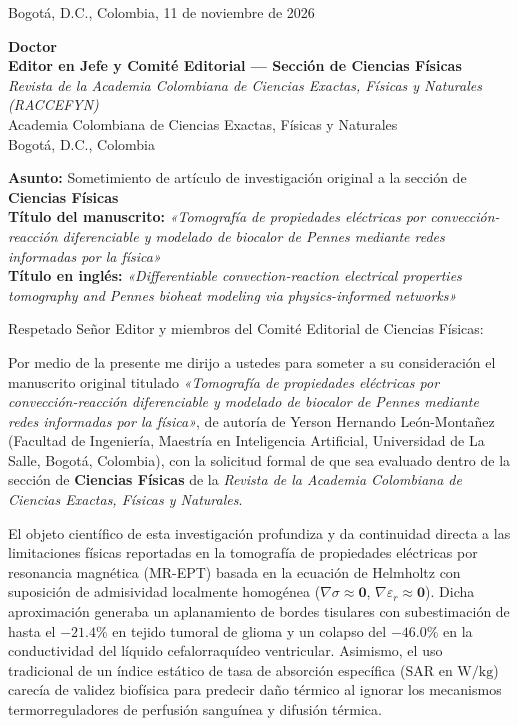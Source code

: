 \documentclass[11pt,a4paper]{article}
\begin{document}
\begin{flushright}
Bogotá, D.C., Colombia, 11 de noviembre de 2026
\end{flushright}

\vspace{0.3cm}

\noindent\textbf{Doctor}\\
\textbf{Editor en Jefe y Comité Editorial — Sección de Ciencias Físicas}\\
\textit{Revista de la Academia Colombiana de Ciencias Exactas, Físicas y Naturales (RACCEFYN)}\\
Academia Colombiana de Ciencias Exactas, Físicas y Naturales\\
Bogotá, D.C., Colombia

\vspace{0.4cm}

\noindent\textbf{Asunto:} Sometimiento de artículo de investigación original a la sección de \textbf{Ciencias Físicas}\\
\textbf{Título del manuscrito:} \textit{«Tomografía de propiedades eléctricas por convección-reacción diferenciable y modelado de biocalor de Pennes mediante redes informadas por la física»}\\
\textbf{Título en inglés:} \textit{«Differentiable convection-reaction electrical properties tomography and Pennes bioheat modeling via physics-informed networks»}

\vspace{0.3cm}

\noindent Respetado Señor Editor y miembros del Comité Editorial de Ciencias Físicas:

Por medio de la presente me dirijo a ustedes para someter a su consideración el manuscrito original titulado \textit{«Tomografía de propiedades eléctricas por convección-reacción diferenciable y modelado de biocalor de Pennes mediante redes informadas por la física»}, de autoría de Yerson Hernando León-Montañez (Facultad de Ingeniería, Maestría en Inteligencia Artificial, Universidad de La Salle, Bogotá, Colombia), con la solicitud formal de que sea evaluado dentro de la sección de \textbf{Ciencias Físicas} de la \textit{Revista de la Academia Colombiana de Ciencias Exactas, Físicas y Naturales}.

El objeto científico de esta investigación profundiza y da continuidad directa a las limitaciones físicas reportadas en la tomografía de propiedades eléctricas por resonancia magnética (MR-EPT) basada en la ecuación de Helmholtz con suposición de admisividad localmente homogénea ($\nabla\sigma \approx \mathbf{0}$, $\nabla\varepsilon_r \approx \mathbf{0}$). Dicha aproximación generaba un aplanamiento de bordes tisulares con subestimación de hasta el $-21.4\%$ en tejido tumoral de glioma y un colapso del $-46.0\%$ en la conductividad del líquido cefalorraquídeo ventricular. Asimismo, el uso tradicional de un índice estático de tasa de absorción específica ($\text{SAR}$ en $\text{W/kg}$) carecía de validez biofísica para predecir daño térmico al ignorar los mecanismos termorreguladores de perfusión sanguínea y difusión térmica.
\end{document}
